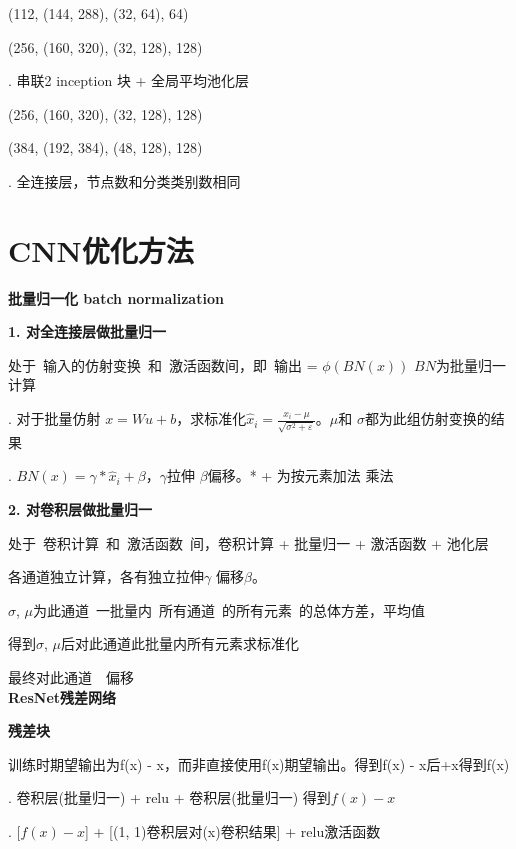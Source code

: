 \documentclass[UTF8]{ctexart}
\begin{document}
  \quad \quad (112, (144, 288), (32, 64), 64)

  \quad \quad (256, (160, 320), (32, 128), 128)

  . 串联2 inception 块 + 全局平均池化层

  \quad \quad (256, (160, 320), (32, 128), 128)

  \quad \quad (384, (192, 384), (48, 128), 128)

  . 全连接层，节点数和分类类别数相同

\section{CNN优化方法}
\noindent \textbf{批量归一化 batch normalization}

  \textbf{1. 对全连接层做批量归一}

  \quad 处于\ 输入的仿射变换\ 和\ 激活函数间，即\ 输出 = $\phi (BN(x))$ $BN$为批量归一计算

  . 对于批量仿射 $x = Wu + b$，求标准化$\hat{x}_i = \frac{{x_i} - \mu}{\sqrt{\sigma^2 + \varepsilon }}$。$\mu $和 $\sigma$都为此组仿射变换的结果

  . $BN(x) = \gamma * \hat{x}_i + \beta $，$\gamma$拉伸 $\beta$偏移。* + 为按元素加法 乘法

  \textbf{2. 对卷积层做批量归一}

  \quad 处于\ 卷积计算\ 和\ 激活函数\ 间，卷积计算 + 批量归一 + 激活函数 + 池化层

  \quad 各通道独立计算，各有独立拉伸$\gamma$ 偏移$\beta$。
  
  \quad $\sigma$, $\mu$为此通道\ 一批量内\ 所有通道\ 的所有元素\ 的总体方差，平均值

  \quad 得到$\sigma$, $\mu$后对此通道此批量内所有元素求标准化

  \quad 最终对此通道\ 
  \ 偏移\\
\textbf{ResNet残差网络}

  \textbf{残差块}

  \quad 训练时期望输出为f(x) - x，而非直接使用f(x)期望输出。得到f(x) - x后+x得到f(x)

  . 卷积层(批量归一) + relu + 卷积层(批量归一) 得到$f(x) - x$
  
  . [$f(x) - x$] + [(1, 1)卷积层对(x)卷积结果] + relu激活函数
  
\end{document}
